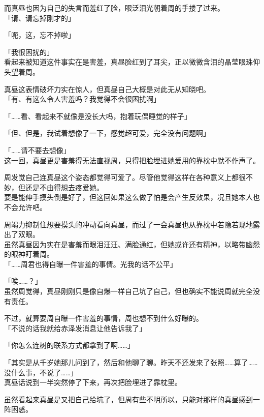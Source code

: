 而真昼也因为自己的失言而羞红了脸，眼泛泪光朝着周的手搂了过来。\\

「请、请忘掉刚才的」

「呃，这，忘不掉啦」

「我很困扰的」\\

看起来被知道这件事实在是害羞，真昼脸红到了耳尖，正以微微含泪的晶莹眼珠仰头望着周。

真昼这表情破坏力实在惊人，但真昼自己大概是对此无从知晓吧。\\

「有、有这么令人害羞吗？我觉得不会很困扰啊」

「……看、看起来不就像是没长大吗，抱着玩偶睡觉的样子」

「但、但是，我试着想像了一下，感觉超可爱，完全没有问题啊」

「……请不要去想像」\\

这一回，真昼更是害羞得无法直视周，只得把脸埋进她爱用的靠枕中默不作声了。

周发觉自己连真昼这个姿态都觉得可爱了。尽管他觉得这样在各种意义上都很不妙，但还是不由得想去疼爱她。\\

要是能伸手摸头倒是好了，但这回如果这么做了怕是会产生反效果，况且她本人也不会允许吧。

周竭力抑制住想要摸头的冲动看向真昼，而过了一会真昼也从靠枕中若隐若现地露出了双眼。\\

虽然真昼因为实在是害羞而眼泪汪汪、满脸通红，但她或许还有精神，以略带幽怨的眼神盯着周。\\

「……周君也得自曝一件害羞的事情。光我的话不公平」

「唉……？」\\

虽然周觉得，真昼刚刚只是像自爆一样自己坑了自己，但也确实不能说周就完全没有责任。

不过，就算要周自曝一件害羞的事情，周也想不到什么好曝的。\\

「不说的话我就给赤泽发消息让他告诉我了」

「你怎么连树的联系方式都拿到了啊……」

「其实是从千岁她那儿问到了，然后和他聊了聊。昨天不还发来了张照……算了……没什么事，不说了……」\\

真昼话说到一半突然停了下来，再次把脸埋进了靠枕里。

虽然看起来真昼是又把自己给坑了，但周有些不明所以，只能对那样的真昼感到一阵困惑。

